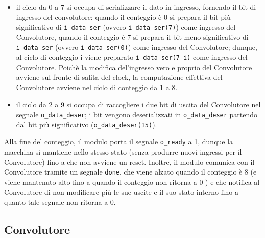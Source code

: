 \documentclass{article}
\begin{document}
\begin{itemize}
    \item il ciclo da 0 a 7 si occupa di serializzare il dato in ingresso, fornendo il bit di ingresso del convolutore: quando il conteggio è 0 si prepara il bit più significativo di \texttt{i\_data\_ser} (ovvero \texttt{i\_data\_ser(7)}) come ingresso del Convolutore, quando il conteggio è 7 si prepara il bit meno significativo di \texttt{i\_data\_ser} (ovvero \texttt{i\_data\_ser(0)}) come ingresso del Convolutore; dunque, al ciclo di conteggio i viene preparato \texttt{i\_data\_ser(7-i)} come ingresso del Convolutore. Poichè la modifica del'ingresso vero e proprio del Convolutore avviene sul fronte di salita del clock, la computazione effettiva del Convolutore avviene nel ciclo di conteggio da 1 a 8.
    \item il ciclo da 2 a 9 si occupa di raccogliere i due bit di uscita del Convolutore nel segnale \texttt{o\_data\_deser}; i bit vengono deserializzati in \texttt{o\_data\_deser} partendo dal bit più significativo (\texttt{o\_data\_deser(15)}).
\end{itemize}
Alla fine del conteggio, il modulo porta il segnale \texttt{o\_ready} a 1, dunque la macchina si mantiene nello stesso stato (senza produrre nuovi ingressi per il Convolutore) fino a che non avviene un reset. Inoltre, il modulo comunica con il Convolutore tramite un segnale \texttt{done}, che viene alzato quando il conteggio è 8 (e viene mantenuto alto fino a quando il conteggio non ritorna a 0 ) e che notifica al Convolutore di non modificare più le sue uscite e il suo stato interno fino a quanto tale segnale non ritorna a 0.

\subsection{Convolutore}
\end{document}
